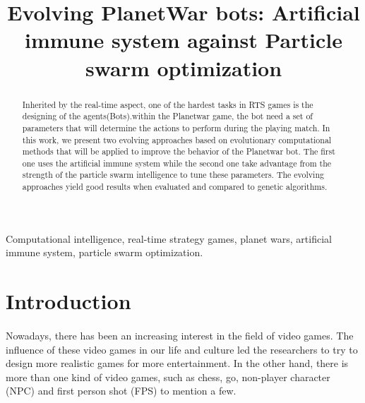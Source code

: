 \documentclass[]{interact}
\theoremstyle{plain}%
\theoremstyle{definition}
\theoremstyle{remark}
\begin{document}

\title{Evolving PlanetWar bots: Artificial immune system against Particle swarm optimization}

\author{
}

\maketitle

\begin{abstract}
Inherited by the real-time aspect, one of the hardest tasks in RTS games is the designing of the agents(Bots).within the Planetwar game, the bot need a set of parameters that will determine the actions to perform during the playing match. In this work, we present two evolving approaches based on evolutionary computational methods that will be applied to improve the behavior of the Planetwar bot. The first one uses the artificial immune system while the second one take advantage from the strength of the particle swarm intelligence to tune these parameters.
The evolving approaches yield good results when  evaluated and compared to genetic algorithms.
\end{abstract}

\begin{keywords}
Computational intelligence, real-time strategy
games, planet wars, artificial immune system, particle swarm optimization.
\end{keywords}


\section{Introduction}
\paragraph*{} 
Nowadays, there has been an increasing interest in the field of video games. The influence of these video games in our life and culture led the researchers to try to design more realistic games for more entertainment. In the other hand, there is more than one kind of video games, such as chess, go, non-player character (NPC) and first
person shot (FPS) to mention a few. 
\end{document}
